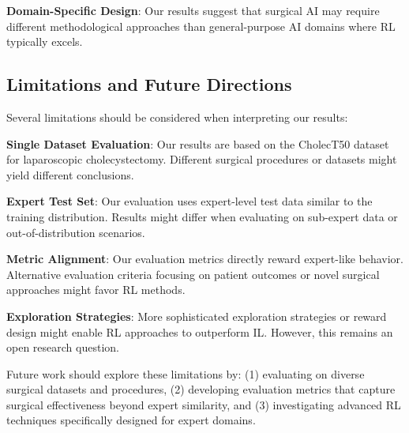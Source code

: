 \textbf{Domain-Specific Design}: Our results suggest that surgical AI may require different methodological approaches than general-purpose AI domains where RL typically excels.

\subsection{Limitations and Future Directions}

Several limitations should be considered when interpreting our results:

\textbf{Single Dataset Evaluation}: Our results are based on the CholecT50 dataset for laparoscopic cholecystectomy. Different surgical procedures or datasets might yield different conclusions.

\textbf{Expert Test Set}: Our evaluation uses expert-level test data similar to the training distribution. Results might differ when evaluating on sub-expert data or out-of-distribution scenarios.

\textbf{Metric Alignment}: Our evaluation metrics directly reward expert-like behavior. Alternative evaluation criteria focusing on patient outcomes or novel surgical approaches might favor RL methods.

\textbf{Exploration Strategies}: More sophisticated exploration strategies or reward design might enable RL approaches to outperform IL. However, this remains an open research question.

Future work should explore these limitations by: (1) evaluating on diverse surgical datasets and procedures, (2) developing evaluation metrics that capture surgical effectiveness beyond expert similarity, and (3) investigating advanced RL techniques specifically designed for expert domains.
